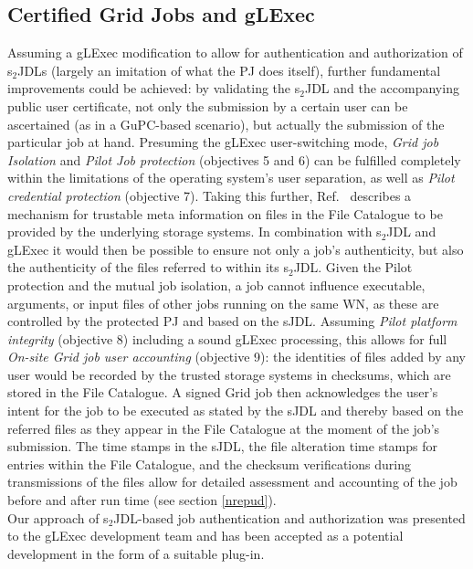 \documentclass[10pt]{iopart}
\begin{document}
\subsection{Certified Grid Jobs and gLExec}
\label{sjdlgl}
Assuming a gLExec modification to allow for authentication and authorization of
s$_2$JDLs (largely an imitation of what the PJ does itself),
further fundamental improvements could be achieved: by validating the
s$_2$JDL and
the accompanying public user certificate, not only the submission by a certain user
can be ascertained (as in a GuPC-based scenario), but actually the submission of
the particular job at hand. Presuming the gLExec user-switching mode, \textit{Grid
job Isolation} and \textit{Pilot Job protection} (objectives 5 and 6) can be
fulfilled completely within the limitations of the operating
system's user separation, as well as \textit{Pilot credential protection} (objective 7).
Taking this further, Ref.~
describes a mechanism for trustable meta information on files in the File Catalogue to be
provided by the underlying storage systems. In combination with s$_2$JDL and
gLExec it would then be possible to ensure not only a job's authenticity, but also the
authenticity of the files referred to within its s$_2$JDL. Given the Pilot
protection and the mutual job isolation, a job cannot influence executable,
arguments, or input files of other jobs running on the same WN,
as these are controlled by the protected PJ and based on the sJDL.
Assuming \textit{Pilot platform integrity} (objective 8) including a sound
gLExec processing, this allows for full \textit{On-site Grid job
user accounting} (objective 9): the identities of files added by any user
would be recorded by the trusted storage systems in checksums, which are stored in
the File Catalogue.  A signed Grid job then acknowledges the user's intent for the
job to be executed as stated by the sJDL and thereby based on the referred files
as they appear in the File Catalogue at the moment of the job's submission. The time
stamps in the sJDL, the file alteration time stamps for
entries within the File Catalogue, and the checksum verifications during
transmissions of the files allow for detailed assessment and accounting of the
job before and after run time (see section \ref{nrepud}).\\
Our approach of s$_2$JDL-based job authentication and
authorization was presented to the gLExec development team and
has been accepted as a potential development in the form of a suitable plug-in.
\end{document}
